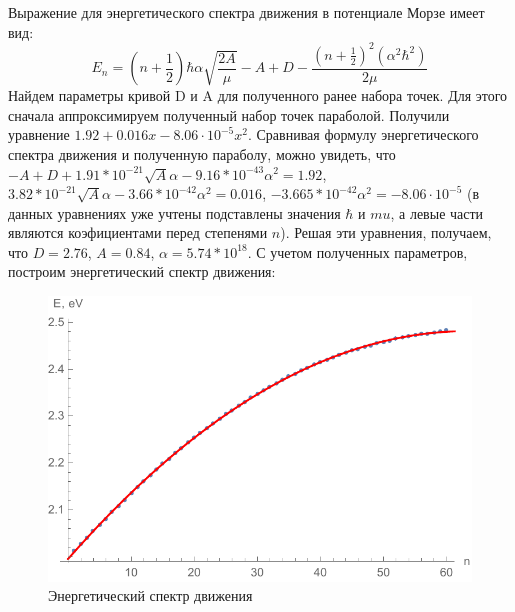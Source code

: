 \documentclass[a4paper, 12pt]{article}
\begin{document}
Выражение для энергетического спектра движения в потенциале Морзе имеет вид:
\begin{equation*}
	E_n=\left(n+\frac{1}{2}\right)\hbar\alpha\sqrt{\frac{2A}{\mu}}-A+D-\frac{\left(n+\frac{1}{2}\right)^2(\alpha^2\hbar^2)}{2\mu}
\end{equation*}
Найдем параметры кривой D и A для полученного ранее набора точек. Для этого сначала аппроксимируем полученный набор точек параболой. Получили уравнение $1.92 + 0.016 x - 8.06\cdot 10^{-5} x^2$. Сравнивая формулу энергетического спектра движения и полученную параболу, можно увидеть, что $-A + D + 1.91*10^{-21} \sqrt{A} \alpha - 9.16*10^{-43} \alpha^2=1.92$, $3.82*10^{-21} \sqrt{A} \alpha - 3.66*10^{-42} \alpha^2=0.016$, $-3.665*10^{-42} \alpha^2=- 8.06\cdot 10^{-5}$ (в данных уравнениях уже учтены подставлены значения $\hbar$ и $mu$, а левые части являются коэфициентами перед степенями $n$). Решая эти уравнения, получаем, что $D=2.76$, $A=0.84$, $\alpha=5.74*10^{18}$. С учетом полученных параметров, построим энергетический спектр движения:
\begin{figure}[!htb]
\centering
\includegraphics[scale=0.9]{plotNew1.pdf}
\caption{Энергетический спектр движения}
\end{figure}
\end{document}
